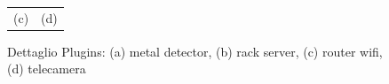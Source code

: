 \begin{figure}[htbp]
\begin{center}
\begin{tabular}{c @{\hspace{1em}} c}
 (c) & (d) \\
\end{tabular}
\end{center}
\caption{Dettaglio Plugins: (a) metal detector, (b) rack server, (c) router wifi, (d) telecamera}\label{fig:figura7}
\end{figure}
